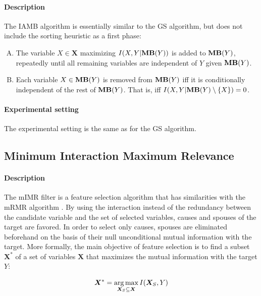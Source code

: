 \paragraph{Description} The IAMB algorithm \parencite{tsamardinos2003algorithms}
is essentially similar to the GS algorithm, but does not include the sorting
heuristic as a first phase:

\begin{enumerate}[A)]
    \item The variable $X\in\bm X$ maximizing $I(X, Y|\textbf{MB}(Y))$ is added
    to $\textbf{MB}(Y)$, repeatedly until all remaining variables are
    independent of $Y$ given $\textbf{MB}(Y)$.
    \item Each variable $X\in\textbf{MB}(Y)$ is removed from $\textbf{MB}(Y)$
    iff it is conditionally independent of the rest of $\textbf{MB}(Y)$. That
    is, iff $I(X, Y|\textbf{MB}(Y)\setminus\{X\}) = 0$.
\end{enumerate}

\paragraph{Experimental setting} The experimental setting is the same as for
the GS algorithm.

\subsection{Minimum Interaction Maximum Relevance}

\paragraph{Description} The mIMR filter \parencite{bontempi2010causal} is a
feature selection algorithm that has similarities with the mRMR algorithm
\parencite{peng2005feature}. By using the interaction instead of the redundancy
between the candidate variable and the set of selected variables, causes and
spouses of the target are favored. In order to select only causes, spouses are
eliminated beforehand on the basis of their null unconditional mutual
information with the target. More formally, the main objective of feature
selection is to find a subset $\bm X^*$ of a set of variables $\bm X$ that
maximizes the mutual information with the target $Y$:

\begin{equation}
\bm X^*=\operatorname*{arg\,max}_{\bm X_S\subseteq \bm X} I(\bm X_S,Y)
\end{equation}

